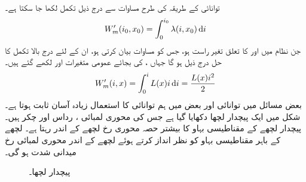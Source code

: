 توانائی کے طریقہ  کی طرح مساوات  سے درج ذیل تکمل لکھا جا سکتا ہے۔
\begin{align}
W_m'(i_0,x_0)=\int_{0}^{i_0} \lambda(i,x_0) \dif i
\end{align}
جن نظام میں  اور  کا تعلق تغیر راست ہو، جس کو مساوات  بیان کرتی ہو، ان کے لئے درج بالا تکمل کا حل درج ذیل ہو گا  جہاں ،  کی بجائے عمومی متغیرات  اور  لکھے گئے ہیں۔
\begin{align}\label{مساوات_تبادلہ_کوتوانائی_مساوی_امالہ_مربع_رو}
W_m'(i,x)=\int_{0}^{i} L(x) i  \dif i=\frac{L(x) i^2}{2}
\end{align}
بعض مسائل میں توانائی اور  بعض میں ہم توانائی کا استعمال زیادہ آسان ثابت ہوتا ہے۔
%
شکل   میں ایک پیچدار لچھا دکھایا گیا ہے جس کی محوری لمبائی ،   رداس   اور چکر   ہیں۔پیچدار لچھے کے مقناطیسی بہاو کا بیشتر حصہ محوری رخ  لچھے کے اندر رہتا ہے۔ لچھے کے باہر مقناطیسی بہاو کو نظر انداز کرتے ہوئے  لچھے کے اندر محوری لمبائی رخ میدانی شدت  ہو گی۔
\begin{figure}
\centering
%
\caption{پیچدار لچھا۔}
\label{شکل_تبادلہ_توانائی_پیچدار_لچھا}
\end{figure}

